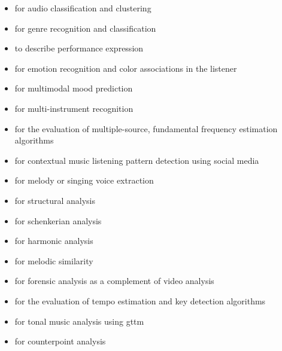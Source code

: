 \begin{itemize}


\item for audio classification and clustering \parencite{ilprints489, DBLP:conf/ismir/HomburgMMMW05, marcelo_queiroz_2018_1422585}
\item for genre recognition and classification \parencite{Tza02:Mus, DBLP:conf/icmc/XuZY05, DBLP:conf/ismir/SillaKK08, icmc/bbp2372.2010.003, DBLP:journals/corr/abs-1803-04652, DBLP:journals/corr/WangH17a, DBLP:journals/corr/MitraS14,2010NJPh:12e3030C, DBLP:journals/corr/abs-0812-4235}

\item to describe performance expression \parencite{DBLP:conf/ismir/HashidaMK08, mitsuyo_hashida_2017_1401963, mitsuyo_hashida_2018_1422503}
\item for emotion recognition and color associations in the listener \parencite{DBLP:conf/ismir/PesekGPSGSPM14}
\item for multimodal mood prediction \parencite{DBLP:journals/corr/abs-1809-07276, xiao_hu_2014_850795, humberto_corona_2015_851021}


\item for multi-instrument recognition \parencite{DBLP:conf/ismir/HumphreyDM18}
\item for the evaluation of multiple-source, fundamental frequency estimation algorithms \parencite{DBLP:conf/ismir/YehBR07}
\item for contextual music listening pattern detection using social media \parencite{DBLP:conf/ismir/HaugerSKT13}
\item for melody \parencite{ioannis_karydis_2007_849469, DBLP:conf/ismir/BittnerSTMCB14} or singing voice \parencite{DBLP:journals/corr/abs-1711-00048} extraction


\item for structural analysis \parencite{DBLP:conf/ismir/SmithBFRD11}
\item for schenkerian analysis \parencite{DBLP:conf/ismir/Kirlin14}
\item for harmonic analysis \parencite{DBLP:conf/ismir/DevaneyACN15}
\item for melodic similarity \parencite{goffredo_haus_2005_849297}
\item for forensic analysis as a complement of video analysis \parencite{serizel:hal-01393959}
\item for the evaluation of tempo estimation and key detection algorithms \parencite{DBLP:conf/ismir/KneesFHVBHG15}
\item for tonal music analysis using \gls{gttm} \parencite{DBLP:conf/ismir/HamanakaHT14}
\item for counterpoint analysis \parencite{DBLP:conf/ismir/AntilaC14}



\end{itemize}
